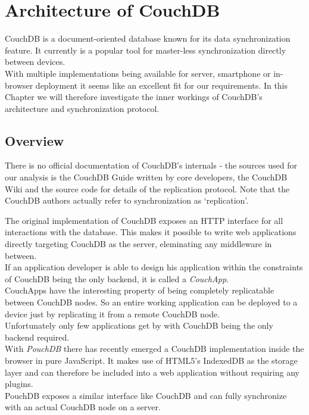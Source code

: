 
\chapter{Architecture of CouchDB}
\label{sec:couchdb}
CouchDB is a document-oriented database known for its data synchronization feature.
It currently is a popular tool for master-less synchronization directly between devices.\\
With multiple implementations being available for server, smartphone or in-browser deployment it seems like an excellent fit for our requirements.
In this Chapter we will therefore investigate the inner workings of CouchDB's architecture and synchronization protocol.

\section{Overview}
There is no official documentation of CouchDB's internals - the sources used for our analysis is the CouchDB Guide \cite{anderson2010couchdb} written by core developers, the CouchDB Wiki \cite{couchdb_wiki} and the source code \cite{couchdb_source} for details of the replication protocol.
Note that the CouchDB authors actually refer to synchronization as `replication'.

The original implementation of CouchDB exposes an HTTP interface for all interactions with the database.
This makes it possible to write web applications directly targeting CouchDB as the server, eleminating any middleware in between.\\
If an application developer is able to design his application within the constraints of CouchDB being the only backend, it is called a \emph{CouchApp}.\\
CouchApps have the interesting property of being completely replicatable between CouchDB nodes.
So an entire working application can be deployed to a device just by replicating it from a remote CouchDB node.\\
Unfortunately only few applications get by with CouchDB being the only backend required.\\

With \emph{PouchDB} there has recently emerged a CouchDB implementation inside the browser in pure JavaScript.
It makes use of HTML5's IndexedDB as the storage layer and can therefore be included into a web application without requiring any plugins.\\
PouchDB exposes a similar interface like CouchDB and can fully synchronize with an actual CouchDB node on a server.\\

